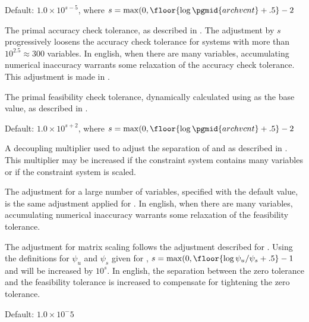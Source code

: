 \begin{codedoc}
  \item{}
    \kw{;}

  Default: $1.0 \times 10^{s-5}$,
      where $s = \max (0, \floor{\log \pgmid{archvcnt} + .5}-2$

  The primal accuracy check tolerance, as described in
  .
  The adjustment by $s$ progressively loosens the accuracy check tolerance
  for systems with more than $10^{2.5} \approx 300$ variables.
  In english, when there are many variables, accumulating numerical inaccuracy
  warrants some relaxation of the accuracy check tolerance.
  This adjustment is made in .

  \item{}

  The primal feasibility check tolerance, dynamically calculated using
   as the base value, as described in .

  \item{}
    \kw{;}

  Default: $1.0 \times 10^{s+2}$, 
      where $s = \max (0, \floor{\log \pgmid{archvcnt} + .5}-2$

  A decoupling multiplier used to adjust the separation of 
  and  as described in .
  This multiplier may be increased if the constraint system contains many
  variables or if the constraint system is scaled.

  The adjustment for a large number of variables, specified with the default
  value, is the same adjustment applied for .
  In english, when there are many variables, accumulating numerical inaccuracy
  warrants some relaxation of the feasibility tolerance.

  The adjustment for matrix scaling follows the adjustment described for
  .
  Using the definitions for $\psi_u$ and $\psi_s$ given for ,
  $s = \max (0, \floor{\log \psi_u/\psi_s + .5}-1$
  and  will be increased by $10^s$.
  In english, the separation between the zero tolerance and the feasibility
  tolerance is increased to compensate for tightening the zero tolerance.

  \item{}
    \kw{;}

  Default: $1.0 \times 10^-5$


\end{codedoc}
